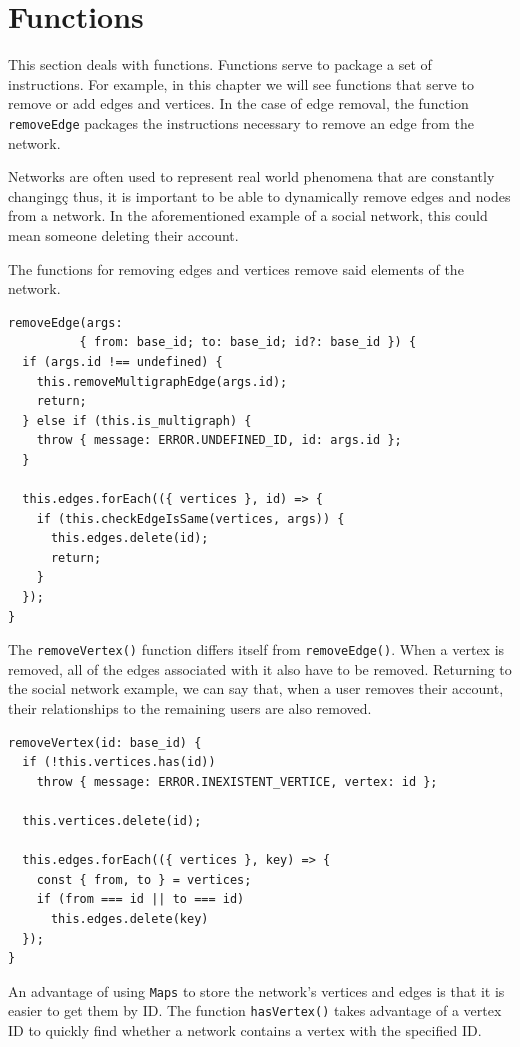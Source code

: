 \chapter{Functions}

This section deals with functions.
Functions serve to package a set of instructions.
For example, in this chapter we will see functions that serve
to remove or add edges and vertices.
In the case of edge removal, the function
\texttt{removeEdge} packages the instructions
necessary to remove an edge from the network.

Networks are often used to represent real world
phenomena that are constantly changingç thus,
it is important to be able to dynamically remove
edges and nodes from a network.
In the aforementioned example of a social network,
this could mean someone deleting their account.

The functions for removing edges and vertices remove said elements of the network.

\begin{verbatim}
removeEdge(args:
          { from: base_id; to: base_id; id?: base_id }) {
  if (args.id !== undefined) {
    this.removeMultigraphEdge(args.id);
    return;
  } else if (this.is_multigraph) {
    throw { message: ERROR.UNDEFINED_ID, id: args.id };
  }

  this.edges.forEach(({ vertices }, id) => {
    if (this.checkEdgeIsSame(vertices, args)) {
      this.edges.delete(id);
      return;
    }
  });
}
\end{verbatim}

The \texttt{removeVertex()} function differs itself from
\texttt{removeEdge()}.
When a vertex is removed, all of the edges associated with it also have to be removed.
Returning to the social network example, we can say that, when
a user removes their account, their relationships to the remaining
users are also removed.

\begin{verbatim}
removeVertex(id: base_id) {
  if (!this.vertices.has(id))
    throw { message: ERROR.INEXISTENT_VERTICE, vertex: id };

  this.vertices.delete(id);

  this.edges.forEach(({ vertices }, key) => {
    const { from, to } = vertices;
    if (from === id || to === id)
      this.edges.delete(key)
  });
}
\end{verbatim}

An advantage of using \texttt{Maps}
to store the network's vertices and edges is that it is easier to get
them by ID.
The function \texttt{hasVertex()} takes advantage of
a vertex ID to quickly find whether a network contains a
vertex with the specified ID.

